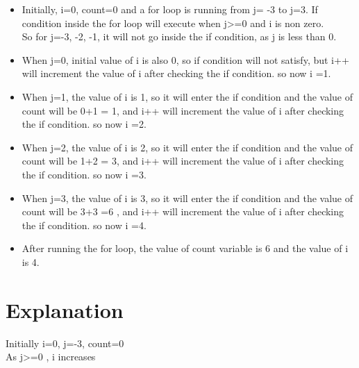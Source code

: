 \documentclass[journal,12pt,twocolumn]{IEEEtran}
\begin{document}
\begin{itemize}
    \item  Initially, i=0, count=0 and a for loop is running from j= -3 to j=3. If condition inside the for loop will execute when j>=0 and i is non zero.\\
    So for j=-3, -2, -1, it will not go inside the if condition, as j is less than 0.
    \item When j=0, initial value of i is also 0, so if condition will not satisfy, but i++ will increment the value of i after checking the if condition. so now i =1.
    \item When j=1, the value of i is 1, so it will enter the if condition and the value of count will be 0+1 = 1, and i++ will increment the value of i after checking the if condition. so now i =2.
    \item When j=2, the value of i is 2, so it will enter the if condition and the value of count will be 1+2 = 3, and i++ will increment the value of i after checking the if condition. so now i =3.
     \item When j=3, the value of i is 3, so it will enter the if condition and the value of count will be 3+3 =6 , and i++ will increment the value of i after checking the if condition. so now i =4.
    \item After running the for loop, the value of count variable is 6 and the value of i is 4.\\ \vspace{0.1in}\vspace{0.1in}
\end{itemize}

\chapter{\textbf{Explanation}}

 Initially i=0, j=-3, count=0 \\
 As j>=0 , i increases \\
\end{document}
